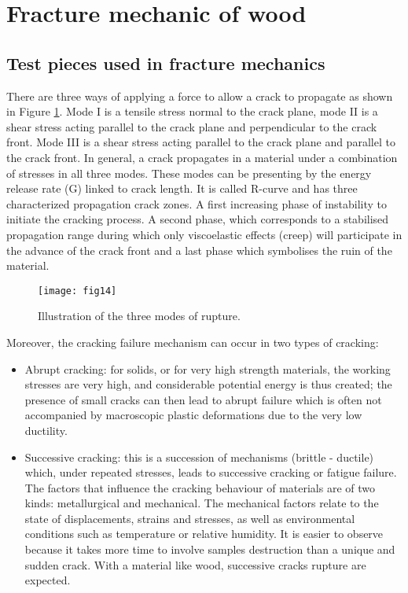 \section{Fracture mechanic of wood}

\subsection{Test pieces used in fracture mechanics}

There are three ways of applying a force to allow a crack to propagate as shown in Figure \ref{fig:fig14}. Mode I is a tensile stress normal to the crack plane, mode II is a shear stress acting parallel to the crack plane and perpendicular to the crack front. Mode III is a shear stress acting parallel to the crack plane and parallel to the crack front. In general, a crack propagates in a material under a combination of stresses in all three modes. These modes can be presenting by the energy release rate (G) linked to crack length. It is called R-curve and has three characterized propagation crack zones. A first increasing phase of instability to initiate the cracking process. A second phase, which corresponds to a stabilised propagation range during which only viscoelastic effects (creep) will participate in the advance of the crack front and a last phase which symbolises the ruin of the material.


\begin{figure}[htp]
	\centering
	\texttt{[image: fig14]}
	\caption{Illustration of the three modes of rupture.}
	\label{fig:fig14}
\end{figure}

Moreover, the cracking failure mechanism can occur in two types of cracking: 

\begin{itemize}
	\item Abrupt cracking: for solids, or for very high strength materials, the working stresses are very high, and considerable potential energy is thus created; the presence of small cracks can then lead to abrupt failure which is often not accompanied by macroscopic plastic deformations due to the very low ductility. 
	\item Successive cracking: this is a succession of mechanisms (brittle - ductile) which, under repeated stresses, leads to successive cracking or fatigue failure. The factors that influence the cracking behaviour of materials are of two kinds: metallurgical and mechanical. The mechanical factors relate to the state of displacements, strains and stresses, as well as environmental conditions such as temperature or relative humidity. It is easier to observe because it takes more time to involve samples destruction than a unique and sudden crack. With a material like wood, successive cracks rupture are expected.
\end{itemize}

